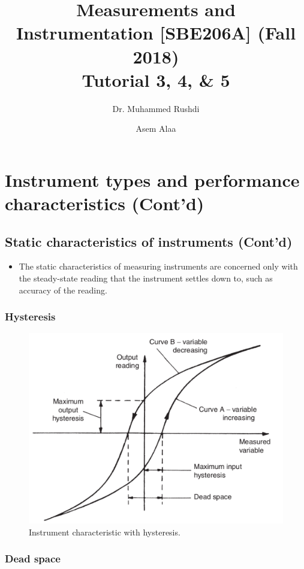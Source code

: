 \documentclass[a4paper,11pt]{book}
\begin{document}
\author{Dr. Muhammed Rushdi \and Asem Alaa}

\title{Measurements and Instrumentation [SBE206A] (Fall 2018)\\ Tutorial 3, 4, \& 5}

\maketitle

\chapter*{Instrument types and performance characteristics (Cont'd)}


\section*{Static characteristics of instruments (Cont'd)}

\begin{itemize}
\item The static characteristics of measuring instruments are concerned only with the steady-state reading that the instrument settles down to, such as accuracy of the reading.
\end{itemize}

\subsection*{Hysteresis}


\begin{figure}[h!]\label{fig:hysteresis}
\centering
  \includegraphics[width=0.7\linewidth]{hysteresis}
  \caption{ Instrument characteristic with hysteresis.} 
\end{figure}


\subsection*{Dead space}
\end{document}
